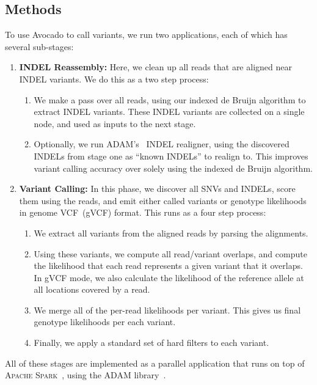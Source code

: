 \documentclass{bioinfo}
\begin{document}
\begin{methods}
\section{Methods}
\label{sec:methods}

To use Avocado to call variants, we run two applications, each of which has several
sub-stages:

\begin{enumerate}
\item \textbf{INDEL Reassembly:} Here, we clean up all reads that are aligned
near INDEL variants. We do this as a two step process:
\begin{enumerate}
\item We make a pass over all reads, using our indexed de Bruijn algorithm
to extract INDEL variants. These INDEL variants are collected on a single node,
and used as inputs to the next stage.
\item Optionally, we run \textsc{ADAM}'s~\citep{massie13, nothaft15} INDEL realigner,
using the discovered INDELs from stage one as ``known INDELs'' to realign to.
This improves variant calling accuracy over solely using the indexed de
Bruijn algorithm.
\end{enumerate}
\item \textbf{Variant Calling:} In this phase, we discover all SNVs and INDELs,
score them using the reads, and emit either called variants or genotype
likelihoods in genome VCF~(gVCF) format. This runs as a four step process:
\begin{enumerate}
\item We extract all variants from the aligned reads by parsing the alignments.
\item Using these variants, we compute all read/variant overlaps, and compute
the likelihood that each read represents a given variant that it overlaps. In
gVCF mode, we also calculate the likelihood of the reference allele at all
locations covered by a read.
\item We merge all of the per-read likelihoods per variant. This gives us final
genotype likelihoods per each variant.
\item Finally, we apply a standard set of hard filters to each variant.
\end{enumerate}
\end{enumerate}

All of these stages are implemented as a parallel application that runs on top of
\textsc{Apache Spark}~\citep{zaharia10, zaharia12}, using the \textsc{ADAM}
library~\citep{massie13, nothaft15}.


\end{methods}
\end{document}
